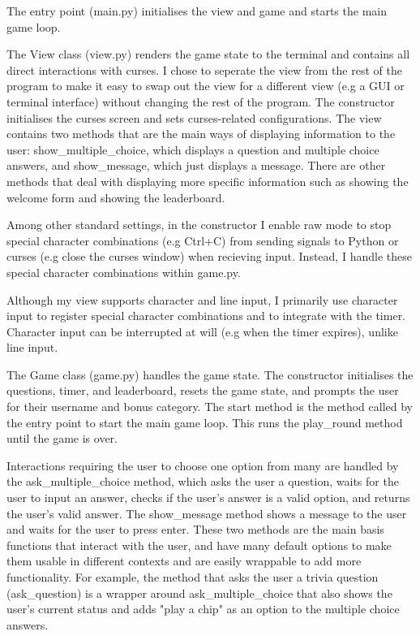 \documentclass[12pt]{article}
\begin{document}
The entry point (main.py) initialises the view and game and starts the main game loop.

\vspace{\baselineskip}

The View class (view.py) renders the game state to the terminal and contains all direct interactions with curses. I chose to seperate the view from the rest of the program to make it easy to swap out the view for a different view (e.g a GUI or terminal interface) without changing the rest of the program. The constructor initialises the curses screen and sets curses-related configurations. The view contains two methods that are the main ways of displaying information to the user: show\_multiple\_choice, which displays a question and multiple choice answers, and show\_message, which just displays a message. There are other methods that deal with displaying more specific information such as showing the welcome form and showing the leaderboard.

Among other standard settings, in the constructor I enable raw mode to stop special character combinations (e.g Ctrl+C) from sending signals to Python or curses (e.g close the curses window) when recieving input. Instead, I handle these special character combinations within game.py.

Although my view supports character and line input, I primarily use character input to register special character combinations and to integrate with the timer. Character input can be interrupted at will (e.g when the timer expires), unlike line input. 

\vspace{\baselineskip}

The Game class (game.py) handles the game state. The constructor initialises the questions, timer, and leaderboard, resets the game state, and prompts the user for their username and bonus category. The start method is the method called by the entry point to start the main game loop. This runs the play\_round method until the game is over.

Interactions requiring the user to choose one option from many are handled by the ask\_multiple\_choice method, which asks the user a question, waits for the user to input an answer, checks if the user's answer is a valid option, and returns the user's valid answer. The show\_message method shows a message to the user and waits for the user to press enter. These two methods are the main basis functions that interact with the user, and have many default options to make them usable in different contexts and are easily wrappable to add more functionality. For example, the method that asks the user a trivia question (ask\_question) is a wrapper around ask\_multiple\_choice that also shows the user's current status and adds "play a chip" as an option to the multiple choice answers.
\end{document}
